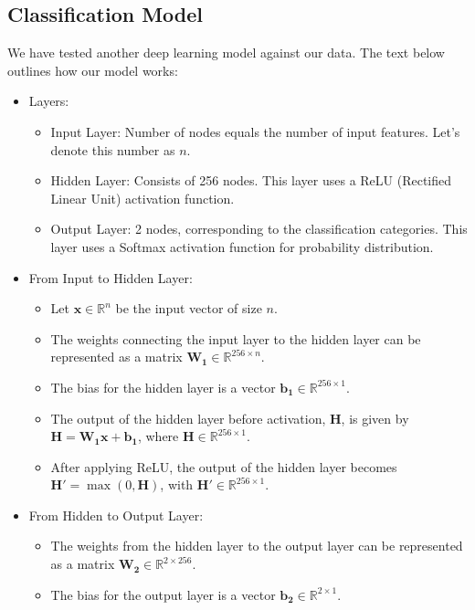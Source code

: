 \documentclass[11pt,a4paper]{article}
\begin{document}
	
	
	\subsection{Classification Model}
	We have tested another deep learning model against our data. The text below outlines how our model works:
	
	\begin{itemize}
		\item Layers:
		\begin{itemize}
			\item Input Layer: Number of nodes equals the number of input features. Let's denote this number as \( n \).
			\item Hidden Layer: Consists of 256 nodes. This layer uses a ReLU (Rectified Linear Unit) activation function.
			\item Output Layer: 2 nodes, corresponding to the classification categories. This layer uses a Softmax activation function for probability distribution.
		\end{itemize}
		\item From Input to Hidden Layer:
		\begin{itemize}
			\item Let \( \mathbf{x} \in \mathbb{R}^{n} \) be the input vector of size \( n \).
			\item The weights connecting the input layer to the hidden layer can be represented as a matrix \( \mathbf{W_1} \in \mathbb{R}^{256 \times n} \).
			\item The bias for the hidden layer is a vector \( \mathbf{b_1} \in \mathbb{R}^{256 \times 1} \).
			\item The output of the hidden layer before activation, \( \mathbf{H} \), is given by  \( \mathbf{H} = \mathbf{W_1} \mathbf{x} + \mathbf{b_1} \), where \( \mathbf{H} \in \mathbb{R}^{256 \times 1} \).
			\item After applying ReLU, the output of the hidden layer becomes \( \mathbf{H'} = \max(0, \mathbf{H}) \), with \( \mathbf{H'} \in \mathbb{R}^{256 \times 1} \).
		\end{itemize}
		\item From Hidden to Output Layer:
		\begin{itemize}
			\item The weights from the hidden layer to the output layer can be represented as a matrix \( \mathbf{W_2} \in \mathbb{R}^{2 \times 256} \).
			\item The bias for the output layer is a vector \( \mathbf{b_2} \in \mathbb{R}^{2 \times 1} \).

\end{itemize}
\end{itemize}
\end{document}
